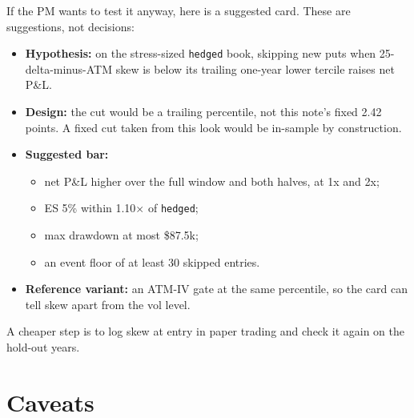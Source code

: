 \documentclass{article}
\begin{document}
If the PM wants to test it anyway, here is a suggested card. These are suggestions, not decisions:

\begin{itemize}

\item \textbf{Hypothesis:} on the stress-sized \texttt{hedged} book, skipping new puts when 25-delta-minus-ATM skew is below its trailing one-year lower tercile raises net P\&L.

\item \textbf{Design:} the cut would be a trailing percentile, not this note's fixed 2.42 points. A fixed cut taken from this look would be in-sample by construction.

\item \textbf{Suggested bar:}

\begin{itemize}

\item net P\&L higher over the full window and both halves, at 1x and 2x;

\item ES 5\% within 1.10\ensuremath{\times} of \texttt{hedged};

\item max drawdown at most \$87.5k;

\item an event floor of at least 30 skipped entries.

\end{itemize}

\item \textbf{Reference variant:} an ATM-IV gate at the same percentile, so the card can tell skew apart from the vol level.

\end{itemize}

A cheaper step is to log skew at entry in paper trading and check it again on the hold-out years.

\section{Caveats}
\end{document}
